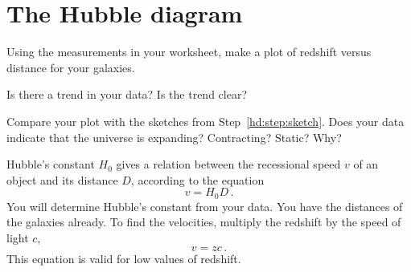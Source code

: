 %
%
%	
%	

\section{The Hubble diagram}

\begin{steps}
	
	\item Using the measurements in your worksheet, make a plot of redshift
	versus distance for your galaxies.
	
	\item Is there a trend in your data? Is the trend clear?
	
	\item Compare your plot with the sketches from Step~\ref{hd:step:sketch}. Does your data
	indicate that the universe is expanding? Contracting? Static? Why?

\end{steps}

Hubble's constant $H_0$ gives a relation between the recessional speed $v$ of an object and its distance $D$, according to the equation
\begin{equation}\label{hd:eq:hubble}
 v = H_0 D \,.
\end{equation}
You will determine Hubble's constant from your data. You have the distances of the galaxies already. To find the velocities, multiply the redshift by the speed of light $c$,
\begin{equation}
 v = zc \,.
\end{equation}
This equation is valid for low values of redshift.

